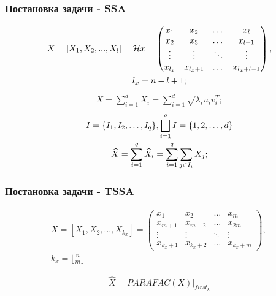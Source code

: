 \documentclass[
	11pt, %
]{beamer}
\begin{document}
\begin{frame}
    \frametitle{Постановка задачи - SSA}
\small
\begin{gather*}
	X = [X_1, X_2, ..., X_{l}] = \mathcal{H} x = 
	 \begin{pmatrix}
		x_{1} & x_{2} & \dots & x_{l} \\
		x_{2} & x_{3} & \dots & x_{l + 1} \\
		\vdots & \vdots & \ddots & \vdots \\
		x_{l_{x}} & x_{l_x + 1} &  \dots & x_{l_x + l - 1}
	\end{pmatrix}, \notag \\
	l_x = n - l + 1;
\end{gather*}
\begin{gather*}
	X = \sum \limits_{i = 1}^{d} X_i = \sum \limits_{i = 1}^{d} \sqrt{\lambda_i} u_i v_i^T;
\end{gather*}
\begin{gather*}
	I = \{ I_1, I_2, \dots, I_q \}, \bigsqcup \limits_{i = 1}^{q} I = \{1, 2, \dots, d\} \notag \\
	\widehat{X} = \sum \limits_{i = 1}^{q} \widehat{X}_i = \sum \limits_{i = 1}^{q} \sum \limits_{j \in I_i} X_j;
\end{gather*}
\end{frame}


\begin{frame}
    \frametitle{Постановка задачи - TSSA}
\small
\begin{gather*}
	X = [X_1, X_2, ..., X_{k_x}] =
	 \begin{pmatrix}
		x_{1} & x_{2} & \dots & x_{m} \\
		x_{m+1} & x_{m+2} & \dots & x_{2m} \\
		\vdots & \vdots & \ddots & \vdots \\
		x_{k_{x}+1} & x_{k_x + 2} &  \dots & x_{k_x + m}
	\end{pmatrix} \text{, }\\
	k_x = \lfloor \frac{n}{m} \rfloor
\end{gather*}

\begin{gather*}
	\widehat{X} = PARAFAC(X) |_{first_k}
\end{gather*}

\end{frame}

\end{document}
